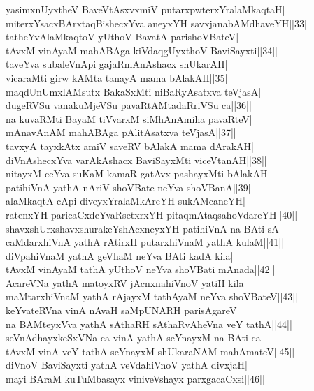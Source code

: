 \documentclass{article}
\begin{document}
yasimxnUyxtheV BaveVtAsxvxmiV putarxpwterxYralaMkaqtaH|\\
miterxYsacxBArxtaqBishecxYva aneyxYH savxjanabAMdhaveYH||33||\\
tatheYvAlaMkaqtoV yUthoV BavatA parishoVBateV|\\
tAvxM vinAyaM mahABAga kiVdaqgUyxthoV BaviSayxti||34||\\
taveYva subaleVnApi gajaRmAnAshacx shUkarAH|\\
vicaraMti girw kAMta tanayA mama bAlakAH||35||\\
maqdUnUmxlAMsutx BakaSxMti niBaRyAsatxva teVjasA|\\
dugeRVSu vanakuMjeVSu pavaRtAMtadaRriVSu ca||36||\\
na kuvaRMti BayaM tiVvarxM siMhAnAmiha pavaRteV|\\
mAnavAnAM mahABAga pAlitAsatxva teVjasA||37||\\
tavxyA tayxkAtx amiV saveRV bAlakA mama dArakAH|\\
diVnAshecxYva varAkAshacx BaviSayxMti viceVtanAH||38||\\
nitayxM ceYva suKaM kamaR gatAvx pashayxMti bAlakAH|\\
patihiVnA yathA nAriV shoVBate neYva shoVBanA||39||\\
alaMkaqtA cApi diveyxYralaMkAreYH sukAMcaneYH|\\
ratenxYH paricaCxdeYvaRsetxrxYH pitaqmAtaqsahoVdareYH||40||\\
shavxshUrxshavxshurakeYshAcxneyxYH patihiVnA na BAti sA|\\
caMdarxhiVnA yathA rAtirxH putarxhiVnaM yathA kulaM||41||\\
diVpahiVnaM yathA geVhaM neYva BAti kadA kila|\\
tAvxM vinAyaM tathA yUthoV neYva shoVBati mAnada||42||\\
AcareVNa yathA matoyxRV jAcnxnahiVnoV yatiH kila|\\
maMtarxhiVnaM yathA rAjayxM tathAyaM neYva shoVBateV||43||\\
keYvateRVna vinA nAvaH saMpUNARH parisAgareV|\\
na BAMteyxVva yathA sAthaRH sAthaRvAheVna veY tathA||44||\\
seVnAdhayxkeSxVNa ca vinA yathA seYnayxM na BAti ca|\\
tAvxM vinA veY tathA seYnayxM shUkaraNAM mahAmateV||45||\\
diVnoV BaviSayxti yathA veVdahiVnoV yathA divxjaH|\\
mayi BAraM kuTuMbasayx viniveVshayx parxgacaCxsi||46||\\
\end{document}
